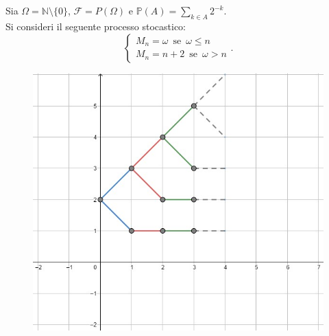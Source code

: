 \documentclass[12pt]{homework}
\begin{document}
   \newpage
  \section{}%
  Sia $\Omega=\mathbb{N}\setminus \{0\}$, $\mathcal{F}=P\left(\Omega\right)$ e $\mathbb{P}\left(A\right)=\sum_{k\in A}2^{-k}$.\\
  Si consideri il seguente processo stocastico:
  \begin{equation*}
  \begin{cases} M_{n}=\omega \,\,\, \text{se} \,\,\, \omega\leq n\\M_{n}=n+2 \,\,\, \text{se} \,\,\, \omega> n\end{cases}.
  \end{equation*}
  \begin{figure}[htb]\centering
\includegraphics[scale=0.60]{martingalaex6.jpg}
  \end{figure}
\end{document}
